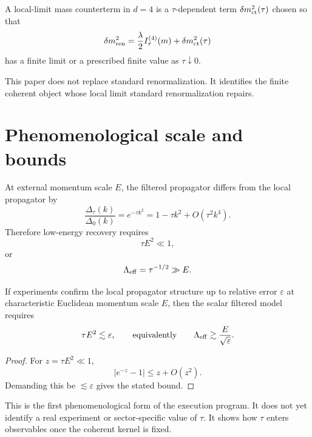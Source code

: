 \documentclass[11pt]{article}
\begin{document}
\begin{center}
\end{center}

\begin{definition}
A local-limit mass counterterm in \(d=4\) is a \(\tau\)-dependent term \(\delta m_{\rm ct}^2(\tau)\) chosen so that
\[
\delta m_{\rm ren}^2
=
\frac{\lambda}{2}I_\tau^{(4)}(m)
+
\delta m_{\rm ct}^2(\tau)
\]
has a finite limit or a prescribed finite value as \(\tau\downarrow0\).
\end{definition}

\begin{remark}
This paper does not replace standard renormalization. It identifies the finite coherent object whose local limit standard renormalization repairs.
\end{remark}

\section{Phenomenological scale and bounds}

At external momentum scale \(E\), the filtered propagator differs from the local propagator by
\[
\frac{\Delta_\tau(k)}{\Delta_0(k)}
=
e^{-\tau k^2}
=
1-\tau k^2+O(\tau^2 k^4).
\]
Therefore low-energy recovery requires
\[
\tau E^2\ll1,
\]
or
\[
\Lambda_{\rm eff}=\tau^{-1/2}\gg E.
\]

\begin{proposition}
If experiments confirm the local propagator structure up to relative error \(\varepsilon\) at characteristic Euclidean momentum scale \(E\), then the scalar filtered model requires
\[
\tau E^2\lesssim \varepsilon,
\qquad
\text{equivalently}\qquad
\Lambda_{\rm eff}\gtrsim \frac{E}{\sqrt{\varepsilon}}.
\]
\end{proposition}

\begin{proof}
For \(z=\tau E^2\ll1\),
\[
|e^{-z}-1|\le z+O(z^2).
\]
Demanding this be \(\lesssim\varepsilon\) gives the stated bound.
\end{proof}

\begin{remark}
This is the first phenomenological form of the execution program. It does not yet identify a real experiment or sector-specific value of \(\tau\). It shows how \(\tau\) enters observables once the coherent kernel is fixed.
\end{remark}
\end{document}
